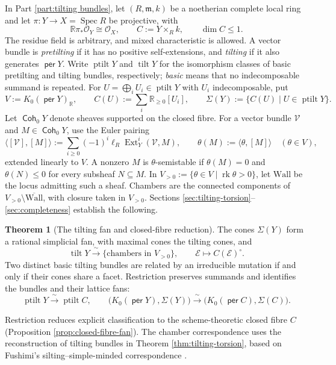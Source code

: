 \documentclass[a4paper,reqno]{amsart}
\def\E{\mathcal{E}}
\def\O{\mathcal{O}}
\def\V{\mathcal{V}}
\def\m{\mathfrak{m}}
\DeclareMathOperator{\Coh}{\mathsf{Coh}}
\DeclareMathOperator{\per}{\mathsf{per}}
\DeclareMathOperator{\Ext}{Ext}
\DeclareMathOperator{\Spec}{Spec}
\DeclareMathOperator{\tilt}{tilt}
\DeclareMathOperator{\ptilt}{ptilt}
\DeclareMathOperator{\rk}{rk}
\theoremstyle{definition}
\newtheorem{IntroThm}{Theorem}
\begin{document}
In Part \ref{part:tilting bundles}, let $(R,\m,k)$ be a noetherian complete local ring and let $\pi\colon Y\to X=\Spec R$ be projective, with
\[
\mathbb R\pi_*\O_Y\cong\O_X,\qquad
C:=Y\times_Rk,\qquad \dim C\le1.
\]
The residue field is arbitrary, and mixed characteristic is allowed. A vector bundle is \emph{pretilting} if it has no positive self-extensions, and \emph{tilting} if it also generates $\per Y$. Write $\ptilt Y$ and $\tilt Y$ for the isomorphism classes of basic pretilting and tilting bundles, respectively; \emph{basic} means that no indecomposable summand is repeated. For $U=\bigoplus_iU_i\in\ptilt Y$ with $U_i$ indecomposable, put
\[
V:=K_0(\per Y)_{\mathbb R},\qquad
C(U):=\sum_i\mathbb R_{\ge0}[U_i],\qquad
\Sigma(Y):=\{C(U)\mid U\in\ptilt Y\}.
\]
Let $\Coh_0Y$ denote sheaves supported on the closed fibre. For a vector bundle $\V$ and $M\in\Coh_0Y$, use the Euler pairing
\[
\langle[\V],[M]\rangle:=\sum_{i\ge0}(-1)^i\ell_R\Ext_Y^i(\V,M),
\qquad \theta(M):=\langle\theta,[M]\rangle\quad(\theta\in V),
\]
extended linearly to $V$. A nonzero $M$ is $\theta$-semistable if $\theta(M)=0$ and $\theta(N)\le0$ for every subsheaf $N\subseteq M$. In $V_{>0}:=\{\theta\in V\mid\rk\theta>0\}$, let $\mathrm{Wall}$ be the locus admitting such a sheaf. Chambers are the connected components of $V_{>0}\setminus\overline{\mathrm{Wall}}$, with closure taken in $V_{>0}$. Sections \ref{sec:tilting-torsion}--\ref{sec:completeness} establish the following.

\begin{IntroThm}[The tilting fan and closed-fibre reduction]\label{intro:tilting-fan}
The cones $\Sigma(Y)$ form a rational simplicial fan, with maximal cones the tilting cones, and
\[
\tilt Y\xrightarrow{\ \sim\ }\{\text{chambers in }V_{>0}\},
\qquad \E\longmapsto C(\E)^\circ.
\]
Two distinct basic tilting bundles are related by an irreducible mutation if and only if their cones share a facet.
Restriction preserves summands and identifies the bundles and their lattice fans:
\[
\ptilt Y\xrightarrow{\ \sim\ }\ptilt C,\qquad
\bigl(K_0(\per Y),\Sigma(Y)\bigr)\xrightarrow{\ \sim\ }
\bigl(K_0(\per C),\Sigma(C)\bigr).
\]
\end{IntroThm}

Restriction reduces explicit classification to the scheme-theoretic closed fibre $C$ (Proposition \ref{prop:closed-fibre-fan}). The chamber correspondence uses the reconstruction of tilting bundles in Theorem \ref{thm:tilting-torsion}, based on Fushimi's silting--simple-minded correspondence \cite[Theorem 3.6]{Fus26}.
\end{document}
